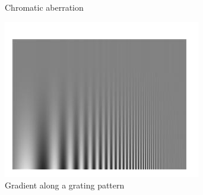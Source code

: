 \begin{mdframed}
\begin{multicols}{3}
\begin{figure}[H]
        \caption{Chromatic aberration}
    \end{figure}
    \begin{figure}[H]
        \centering
        \includegraphics[width=\linewidth]{grating_gradient.png}
        \caption{Gradient along a grating pattern}
    \end{figure}

\end{multicols}\end{mdframed}




